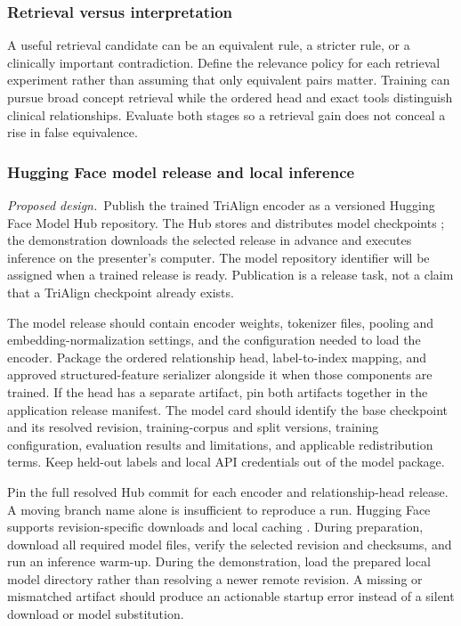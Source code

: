 \documentclass[10pt,letterpaper]{article}
\newcommand{\planned}{\textit{Proposed design.}}
\begin{document}
\subsubsection{Retrieval versus interpretation}
A useful retrieval candidate can be an equivalent rule, a stricter rule, or a
clinically important contradiction. Define the relevance policy for each
retrieval experiment rather than assuming that only equivalent pairs matter.
Training can pursue broad concept retrieval while the ordered head and exact
tools distinguish clinical relationships. Evaluate both stages so a retrieval
gain does not conceal a rise in false equivalence.

\subsubsection{Hugging Face model release and local inference}
\label{sec:modelrelease}
\planned\ Publish the trained TriAlign encoder as a versioned Hugging Face
Model Hub repository. The Hub stores and distributes model checkpoints
\cite{hfhub}; the demonstration downloads the selected release in advance
and executes inference on the presenter's computer. The model repository
identifier will be assigned when a trained release is ready. Publication is
a release task, not a claim that a TriAlign checkpoint already exists.

The model release should contain encoder weights, tokenizer files, pooling
and embedding-normalization settings, and the configuration needed to load
the encoder. Package the ordered relationship head, label-to-index mapping,
and approved structured-feature serializer alongside it when those components
are trained. If the head has a separate artifact, pin both artifacts together
in the application release manifest. The model card should identify the base
checkpoint and its resolved revision, training-corpus and split versions,
training configuration, evaluation results and limitations, and applicable
redistribution terms. Keep held-out labels and local API credentials out of
the model package.

Pin the full resolved Hub commit for each encoder and relationship-head
release. A moving branch name alone is insufficient to reproduce a run.
Hugging Face supports revision-specific downloads and local caching
\cite{hfdownload}. During preparation, download all required model files,
verify the selected revision and checksums, and run an inference warm-up.
During the demonstration, load the prepared local model directory rather
than resolving a newer remote revision. A missing or mismatched artifact
should produce an actionable startup error instead of a silent download or
model substitution.
\end{document}
